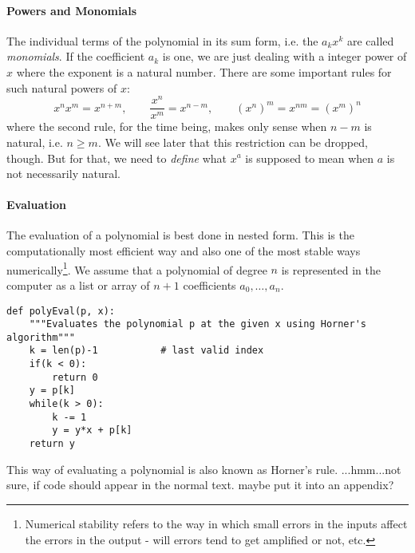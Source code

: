


\paragraph{Powers and Monomials}
The individual terms of the polynomial in its sum form, i.e. the $a_k x^k$ are called \emph{monomials}. If the coefficient $a_k$ is one, we are just dealing with a integer power of $x$ where the exponent is a natural number. There are some important rules for such natural powers of $x$:
\begin{equation}
\label{Eq:PowerRulesNatural}
x^n x^m = x^{n+m}, \qquad
\frac{x^n}{x^m} = x^{n-m}, \qquad
(x^n)^m =  x^{n m} =  (x^m)^n
\end{equation}
where the second rule, for the time being, makes only sense when $n-m$ is natural, i.e. $n \geq m$. We will see later that this restriction can be dropped, though. But for that, we need to \emph{define} what $x^a$ is supposed to mean when $a$ is not necessarily natural.



\paragraph{Evaluation}
The evaluation of a polynomial is best done in nested form. This is the computationally most efficient way and also one of the most stable ways numerically\footnote{Numerical stability refers to the way in which small errors in the inputs affect the errors in the output - will errors tend to get amplified or not, etc.}. We assume that a polynomial of degree $n$ is represented in the computer as a list or array of $n+1$ coefficients $a_0, \ldots, a_n$.
\begin{lstlisting}
def polyEval(p, x):
	"""Evaluates the polynomial p at the given x using Horner's algorithm"""
	k = len(p)-1           # last valid index
	if(k < 0):
		return 0
	y = p[k]
	while(k > 0):
		k -= 1
		y = y*x + p[k]
	return y
\end{lstlisting}
This way of evaluating a polynomial is also known as Horner's rule.
...hmm...not sure, if code should appear in the normal text. maybe put it into an appendix? 


